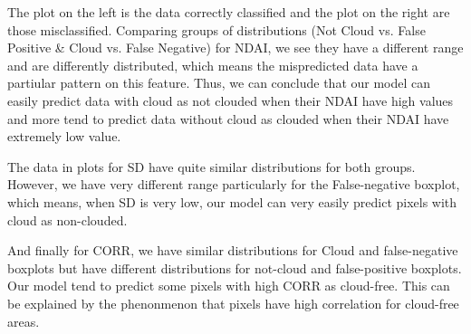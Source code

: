 \documentclass[11pt]{article}
\begin{document}
The plot on the left is the data correctly classified and the plot on the right are those misclassified. Comparing groups of distributions (Not Cloud vs. False Positive \& Cloud vs. False Negative) for NDAI, we see they have a different range and are differently distributed, which means the mispredicted data have a partiular pattern on this feature. Thus, we can conclude that our model can easily predict data with cloud as not clouded when their NDAI have high values and more tend to predict data without cloud as clouded when their NDAI have extremely low value. 

The data in plots for SD have quite similar distributions for both groups. However, we have very different range particularly for the False-negative boxplot, which means, when SD is very low, our model can very easily predict pixels with cloud as non-clouded.

And finally for CORR, we have similar distributions for Cloud and false-negative boxplots but have different distributions for not-cloud and false-positive boxplots. Our model tend to predict some pixels with high CORR as cloud-free. This can be explained by the phenonmenon that pixels have high correlation for cloud-free areas. 
\end{document}
